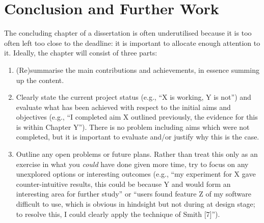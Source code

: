 \documentclass[oneside,%
                    author={Malak Hajji},
                    degree={BSc},
                    title={Designing An Accessible Computational Toolkit For Students},
                  subtitle={With Mixed Visual Abilities}]{dissertation}
\begin{document}

\chapter{Conclusion and Further Work}
\label{chap:conclusion}

\noindent
The concluding chapter of a dissertation is often underutilised because it 
is too often left too close to the deadline: it is important to allocate
enough attention to it.  Ideally, the chapter will consist of three parts:

\begin{enumerate}
\item (Re)summarise the main contributions and achievements, in essence
      summing up the content.
\item Clearly state the current project status (e.g., ``X is working, Y 
      is not'') and evaluate what has been achieved with respect to the 
      initial aims and objectives (e.g., ``I completed aim X outlined 
      previously, the evidence for this is within Chapter Y'').  There 
      is no problem including aims which were not completed, but it is 
      important to evaluate and/or justify why this is the case.
\item Outline any open problems or future plans.  Rather than treat this
      only as an exercise in what you {\em could} have done given more 
      time, try to focus on any unexplored options or interesting outcomes
      (e.g., ``my experiment for X gave counter-intuitive results, this 
      could be because Y and would form an interesting area for further 
      study'' or ``users found feature Z of my software difficult to use,
      which is obvious in hindsight but not during at design stage; to 
      resolve this, I could clearly apply the technique of Smith [7]'').
\end{enumerate}


%
%
%
\end{document}
